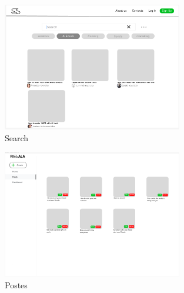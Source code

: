 \begin{figure}
    \centering
    \includegraphics[width=0.7\textwidth,height=1\textheight,keepaspectratio]{interfaces/search.png}
    \caption{Search}
    \label{fig:diagramme}
\end{figure}
\begin{figure}
    \centering
    \includegraphics[width=0.7\textwidth,height=1\textheight,keepaspectratio]{interfaces/posts.png}
    \caption{Postes}
    \label{fig:diagramme}
\end{figure}